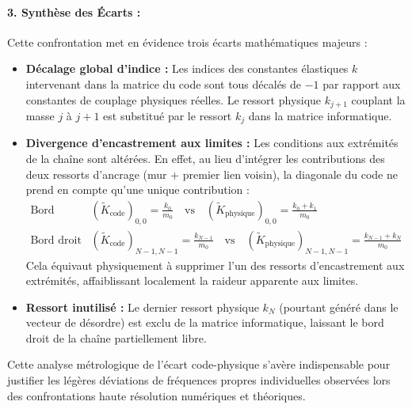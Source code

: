 \paragraph{3. Synthèse des Écarts :}
Cette confrontation met en évidence trois écarts mathématiques majeurs :
\begin{itemize}
    \item \textbf{Décalage global d'indice :} Les indices des constantes élastiques $k$ intervenant dans la matrice du code sont tous décalés de $-1$ par rapport aux constantes de couplage physiques réelles. Le ressort physique $k_{j+1}$ couplant la masse $j$ à $j+1$ est substitué par le ressort $k_j$ dans la matrice informatique.
    \item \textbf{Divergence d'encastrement aux limites :} Les conditions aux extrémités de la chaîne sont altérées. En effet, au lieu d'intégrer les contributions des deux ressorts d'ancrage (mur + premier lien voisin), la diagonale du code ne prend en compte qu'une unique contribution :
    \begin{align}
        \text{Bord gauche : } & \left(\tilde{K}_{\text{code}}\right)_{0,0} = \frac{k_0}{m_0} \quad \text{vs} \quad \left(\tilde{K}_{\text{physique}}\right)_{0,0} = \frac{k_0 + k_1}{m_0} \\
        \text{Bord droit : } & \left(\tilde{K}_{\text{code}}\right)_{N-1,N-1} = \frac{k_{N-1}}{m_0} \quad \text{vs} \quad \left(\tilde{K}_{\text{physique}}\right)_{N-1,N-1} = \frac{k_{N-1} + k_N}{m_0}
    \end{align}
    Cela équivaut physiquement à supprimer l'un des ressorts d'encastrement aux extrémités, affaiblissant localement la raideur apparente aux limites.
    \item \textbf{Ressort inutilisé :} Le dernier ressort physique $k_N$ (pourtant généré dans le vecteur de désordre) est exclu de la matrice informatique, laissant le bord droit de la chaîne partiellement libre.
\end{itemize}
Cette analyse métrologique de l'écart code-physique s'avère indispensable pour justifier les légères déviations de fréquences propres individuelles observées lors des confrontations haute résolution numériques et théoriques.

